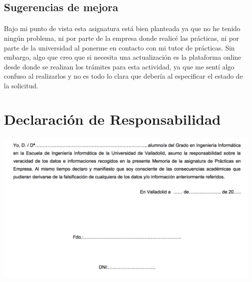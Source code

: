 \documentclass[11pt, a4paper,spanish]{article}
\begin{document}
        \subsection{Sugerencias de mejora}
			\paragraph{}
			Bajo mi punto de vista esta asignatura está bien planteada ya que no he tenido ningún problema, ni por parte de la empresa donde realicé las prácticas, ni por parte de la universidad al ponerme en contacto con mi tutor de prácticas. Sin embargo, algo que creo que si necesita una actualización es la plataforma online desde donde se realizan los trámites para esta actividad, ya que me sentí algo confuso al realizarlos y no es todo lo clara que debería al especificar el estado de la solicitud.



    \newpage
    \section{Declaración de Responsabilidad}

        \includegraphics[width=\textwidth]{res/responsibility-declaration}
\end{document}
